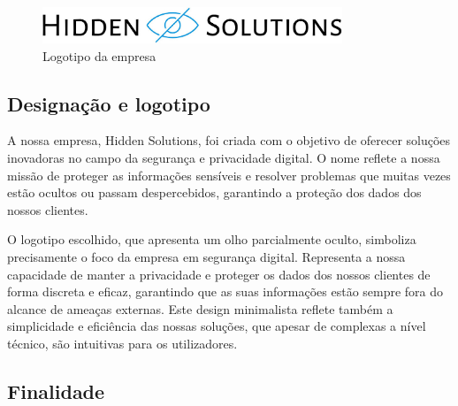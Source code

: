 \par \vspace{32pt}
\begin{figure}[H]
    \centering
    \includegraphics[width=0.8\textwidth]{Figures/0. General/hidden_solutions.jpg}
    \caption{Logotipo da empresa}
    \label{Logotipo da empresa}
\end{figure}

\subsection{Designação e logotipo}
A nossa empresa, Hidden Solutions, foi criada com o objetivo de oferecer soluções inovadoras no campo da segurança e privacidade digital. O nome reflete a nossa missão de proteger as informações sensíveis e resolver problemas que muitas vezes estão ocultos ou passam despercebidos, garantindo a proteção dos dados dos nossos clientes.
\par \vspace{10pt}
O logotipo escolhido, que apresenta um olho parcialmente oculto, simboliza precisamente o foco da empresa em segurança digital. Representa a nossa capacidade de manter a privacidade e proteger os dados dos nossos clientes de forma discreta e eficaz, garantindo que as suas informações estão sempre fora do alcance de ameaças externas. Este design minimalista reflete também a simplicidade e eficiência das nossas soluções, que apesar de complexas a nível técnico, são intuitivas para os utilizadores.
\subsection{Finalidade}